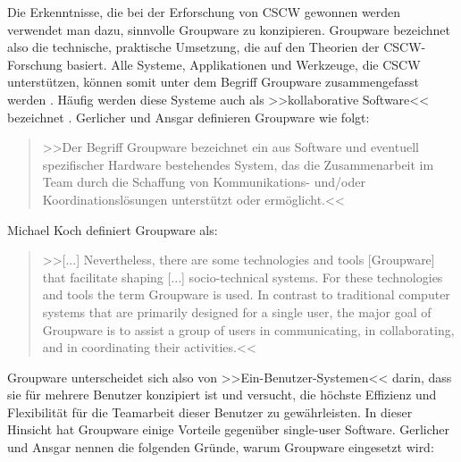 	\bigskip Die Erkenntnisse, die bei der Erforschung von \ac{CSCW} gewonnen werden verwendet man dazu, sinnvolle Groupware  zu konzipieren. Groupware bezeichnet also die technische, praktische Umsetzung, die auf den Theorien der \ac{CSCW}-Forschung basiert. Alle Systeme, Applikationen und Werkzeuge, die \ac{CSCW} unterstützen, können somit unter dem Begriff Groupware zusammengefasst werden \citep{Koch2008, Gerlicher:2007p241}. Häufig werden diese Systeme auch als >>kollaborative Software<< bezeichnet \citep{Bannon:1990p244}. Gerlicher und Ansgar definieren Groupware wie folgt:
	
	\medskip\begin{quote}>>Der Begriff Groupware bezeichnet ein aus Software und eventuell spezifischer Hardware bestehendes System, das die Zusammenarbeit im Team durch die Schaffung von Kommunikations- und/oder Koordinationslösungen unterstützt oder ermöglicht.<< \begin{flushright}\citep{Gerlicher:2007p241}\end{flushright}\end{quote}
	
	\medskip Michael Koch definiert Groupware als:
	
	\medskip\begin{quote}>>[...] Nevertheless, there are some technologies and tools [Groupware] that facilitate shaping [...] socio-technical systems. For these technologies and tools the term Groupware is used. In contrast to traditional computer systems that are primarily designed for a single user, the major goal of Groupware is to assist a group of users in communicating, in collaborating, and in coordinating their activities.<< \begin{flushright}\citep{Koch2008}\end{flushright}\end{quote}
	
	\medskip Groupware unterscheidet sich also von >>Ein-Benutzer-Systemen<< darin, dass sie für mehrere Benutzer konzipiert ist und versucht, die höchste Effizienz und Flexibilität für die Teamarbeit dieser Benutzer zu gewährleisten. In dieser Hinsicht hat Groupware einige Vorteile gegenüber single-user Software. Gerlicher und Ansgar nennen die folgenden Gründe, warum Groupware eingesetzt wird: 
	

